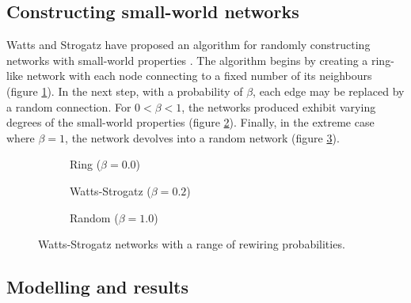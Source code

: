 		\subsection{Constructing small-world networks}
			
			
			Watts and Strogatz have proposed an algorithm for randomly constructing
			networks with small-world properties \cite{watts98}. The algorithm begins
			by creating a ring-like network with each node connecting to a fixed
			number of its neighbours (figure \ref{fig:ringNetworkB0}). In the next
			step, with a probability of $\beta$, each edge may be replaced by a random
			connection.  For $0 < \beta < 1$, the networks produced exhibit varying
			degrees of the small-world properties (figure \ref{fig:ringNetworkB02}).
			Finally, in the extreme case where $\beta=1$, the network devolves into a
			random network (figure \ref{fig:ringNetworkB1}).
			
			\begin{figure}
				\center
				\begin{subfigure}[t]{0.3\textwidth}
					\center
					
					\caption{Ring ($\beta = 0.0$)}
					\label{fig:ringNetworkB0}
				\end{subfigure}
				\begin{subfigure}[t]{0.3\textwidth}
					\center
					
					\caption{Watts-Strogatz ($\beta = 0.2$)}
					\label{fig:ringNetworkB02}
				\end{subfigure}
				\begin{subfigure}[t]{0.3\textwidth}
					\center
					
					\caption{Random ($\beta = 1.0$)}
					\label{fig:ringNetworkB1}
				\end{subfigure}
				
				\caption{Watts-Strogatz networks with a range of rewiring
				probabilities.}
				\label{fig:ringNetwork}
			\end{figure}
		
		\subsection{Modelling and results}
			
			
